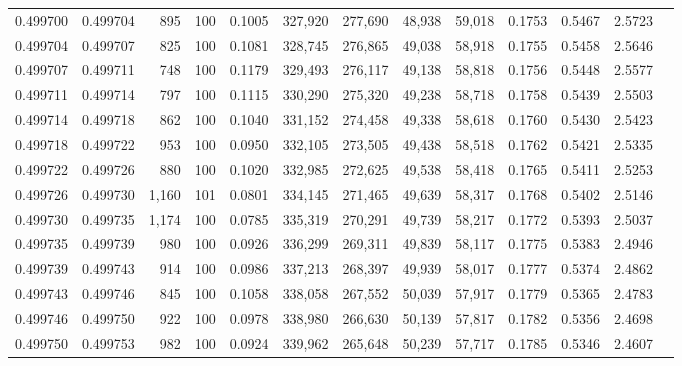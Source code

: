 \begin{tabular}{rrrrrrrrrrrrr}
0.499700 & 0.499704 &   895 & 100 &                                     0.1005 & 327,920 & 277,690 &  48,938 &  59,018 & 0.1753 & 0.5467 & 2.5723 \\
0.499704 & 0.499707 &   825 & 100 &                                     0.1081 & 328,745 & 276,865 &  49,038 &  58,918 & 0.1755 & 0.5458 & 2.5646 \\
0.499707 & 0.499711 &   748 & 100 &                                     0.1179 & 329,493 & 276,117 &  49,138 &  58,818 & 0.1756 & 0.5448 & 2.5577 \\
0.499711 & 0.499714 &   797 & 100 &                                     0.1115 & 330,290 & 275,320 &  49,238 &  58,718 & 0.1758 & 0.5439 & 2.5503 \\
0.499714 & 0.499718 &   862 & 100 &                                     0.1040 & 331,152 & 274,458 &  49,338 &  58,618 & 0.1760 & 0.5430 & 2.5423 \\
0.499718 & 0.499722 &   953 & 100 &                                     0.0950 & 332,105 & 273,505 &  49,438 &  58,518 & 0.1762 & 0.5421 & 2.5335 \\
0.499722 & 0.499726 &   880 & 100 &                                     0.1020 & 332,985 & 272,625 &  49,538 &  58,418 & 0.1765 & 0.5411 & 2.5253 \\
0.499726 & 0.499730 & 1,160 & 101 &                                     0.0801 & 334,145 & 271,465 &  49,639 &  58,317 & 0.1768 & 0.5402 & 2.5146 \\
0.499730 & 0.499735 & 1,174 & 100 &                                     0.0785 & 335,319 & 270,291 &  49,739 &  58,217 & 0.1772 & 0.5393 & 2.5037 \\
0.499735 & 0.499739 &   980 & 100 &                                     0.0926 & 336,299 & 269,311 &  49,839 &  58,117 & 0.1775 & 0.5383 & 2.4946 \\
0.499739 & 0.499743 &   914 & 100 &                                     0.0986 & 337,213 & 268,397 &  49,939 &  58,017 & 0.1777 & 0.5374 & 2.4862 \\
0.499743 & 0.499746 &   845 & 100 &                                     0.1058 & 338,058 & 267,552 &  50,039 &  57,917 & 0.1779 & 0.5365 & 2.4783 \\
0.499746 & 0.499750 &   922 & 100 &                                     0.0978 & 338,980 & 266,630 &  50,139 &  57,817 & 0.1782 & 0.5356 & 2.4698 \\
0.499750 & 0.499753 &   982 & 100 &                                     0.0924 & 339,962 & 265,648 &  50,239 &  57,717 & 0.1785 & 0.5346 & 2.4607 \\

\end{tabular}
